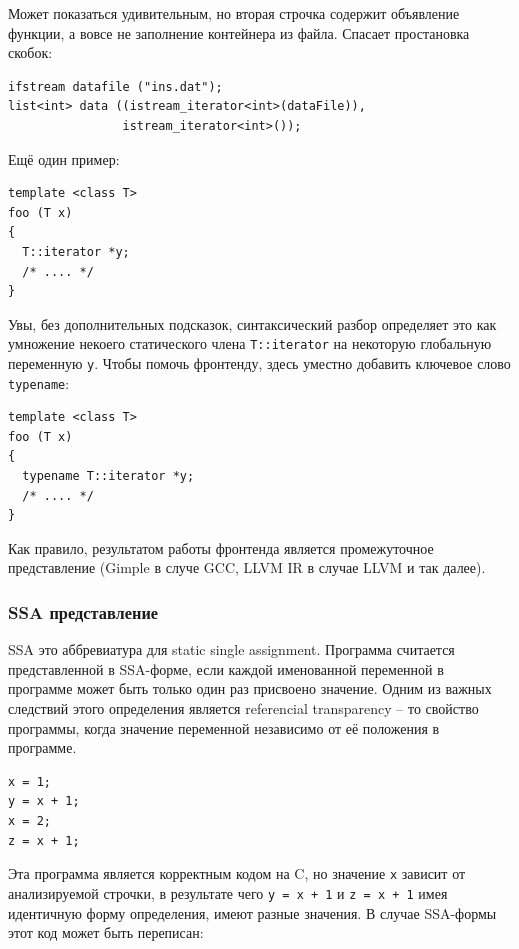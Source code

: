 \documentclass[a4paper,12pt,oneside]{article}
\begin{document}
Может показаться удивительным, но вторая строчка содержит объявление функции, а вовсе не заполнение контейнера из файла. Спасает простановка скобок:

\begin{lstlisting}
ifstream datafile ("ins.dat");
list<int> data ((istream_iterator<int>(dataFile)),
                istream_iterator<int>());
\end{lstlisting}

Ещё один пример:

\begin{lstlisting}
template <class T>
foo (T x)
{
  T::iterator *y;
  /* .... */
}
\end{lstlisting}

Увы, без дополнительных подсказок, синтаксический разбор определяет это как умножение некоего статического члена \lstinline!T::iterator! на некоторую глобальную переменную \lstinline!y!. Чтобы помочь фронтенду, здесь уместно добавить ключевое слово \lstinline!typename!:

\begin{lstlisting}
template <class T>
foo (T x)
{
  typename T::iterator *y;
  /* .... */
}
\end{lstlisting}

Как правило, результатом работы фронтенда является промежуточное представление (Gimple в случе GCC, LLVM IR в случае LLVM и так далее).

\subsubsection{SSA представление}

SSA это аббревиатура для static single assignment. Программа считается представленной в SSA-форме, если каждой именованной переменной в программе может быть только один раз присвоено значение. Одним из важных следствий этого определения является referencial transparency -- то свойство программы, когда значение переменной независимо от её положения в программе.

\begin{lstlisting}
x = 1;
y = x + 1;
x = 2;
z = x + 1;
\end{lstlisting}

Эта программа является корректным кодом на C, но значение \lstinline!x! зависит от анализируемой строчки, в результате чего \lstinline!y = x + 1! и \lstinline!z = x + 1! имея идентичную форму определения, имеют разные значения. В случае SSA-формы этот код может быть переписан:
\end{document}
